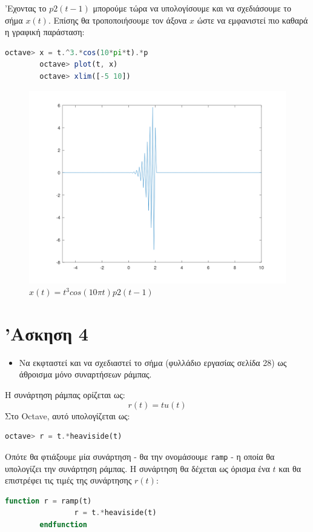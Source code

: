 \documentclass{article}
\begin{document}
'Εχοντας το $p2(t - 1)$ μπορούμε τώρα να υπολογίσουμε και να σχεδιάσουμε
το σήμα $x(t)$. Επίσης θα τροποποιήσουμε τον άξονα $x$ ώστε να εμφανιστεί
πιο καθαρά η γραφική παράσταση:
\begin{lstlisting}[language=octave]
        octave> x = t.^3.*cos(10*pi*t).*p
        octave> plot(t, x)
        octave> xlim([-5 10])
\end{lstlisting}

\begin{figure}[H]
        \centering
        \includegraphics[width=\linewidth]{res/fig4.png}
        \caption{$x(t) = t^3cos(10\pi t)p2(t - 1)$}
\end{figure}

\section{'Ασκηση 4}

\begin{itemize}
        \item Να εκφταστεί και να σχεδιαστεί το σήμα (φυλλάδιο εργασίας
                σελίδα 28) ως άθροισμα μόνο συναρτήσεων ράμπας.
\end{itemize}

Η συνάρτηση ράμπας ορίζεται ως:
\[r(t) = tu(t)\]
Στο Octave, αυτό υπολογίζεται ως:
\begin{lstlisting}[language=octave]
        octave> r = t.*heaviside(t)
\end{lstlisting}
Οπότε θα φτιάξουμε μία συνάρτηση - θα την ονομάσουμε \lstinline{ramp} -
η οποία θα υπολογίζει την συνάρτηση ράμπας. Η συνάρτηση θα δέχεται
ως όρισμα ένα $t$ και θα επιστρέφει τις τιμές της συνάρτησης $r(t)$:
\begin{lstlisting}[language=octave]
        function r = ramp(t)
                r = t.*heaviside(t)
        endfunction
\end{lstlisting}
\end{document}
